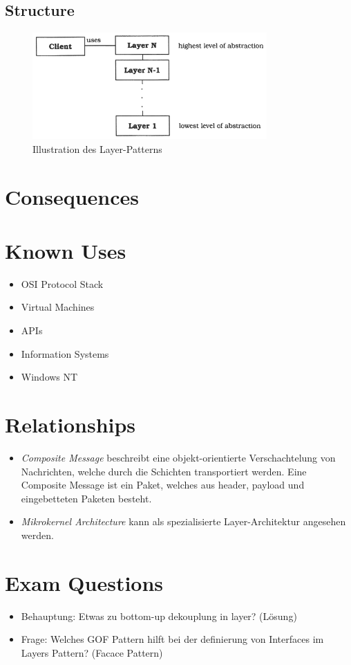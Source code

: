 \subsection{Structure}

\begin{figure}[H]
  \centering
  \includegraphics[width=0.8\textwidth]{figures/00-layers-1}
  \caption{Illustration des Layer-Patterns}
\end{figure}

\section{Consequences}
\begin{itemize}
\end{itemize}

\section{Known Uses}
\begin{itemize}
	\item OSI Protocol Stack 
	\item Virtual Machines
	\item APIs
	\item Information Systems
	\item Windows NT
\end{itemize}

\section{Relationships}
\begin{itemize}
	\item \textit{Composite Message} beschreibt eine objekt-orientierte Verschachtelung von Nachrichten, welche durch die Schichten transportiert werden. Eine Composite Message ist ein Paket, welches aus header, payload und eingebetteten Paketen besteht.
	\item \textit{Mikrokernel Architecture} kann als spezialisierte Layer-Architektur angesehen werden.
\end{itemize}

\section{Exam Questions}
\begin{itemize}
  \item Behauptung: Etwas zu bottom-up dekouplung in layer? (Lösung)
    \item Frage: Welches GOF Pattern hilft bei der definierung von Interfaces im Layers Pattern? (Facace Pattern)
\end{itemize}
